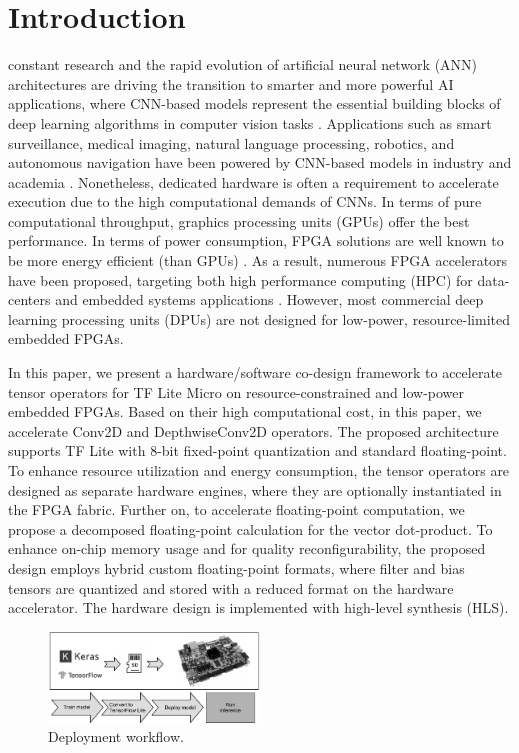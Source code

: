 
\section{Introduction}
\label{sec:introduction}
 constant research and the rapid evolution of artificial neural network (ANN) architectures are driving the transition to smarter and more powerful AI applications, where CNN-based models represent the essential building blocks of deep learning algorithms in computer vision tasks \cite{hassaballah2020deep}. Applications such as smart surveillance, medical imaging, natural language processing, robotics, and autonomous navigation have been powered by CNN-based models in industry and academia \cite{dhillon2020convolutional}. Nonetheless, dedicated hardware is often a requirement to accelerate execution due to the high computational demands of CNNs. In terms of pure computational throughput, graphics processing units (GPUs) offer the best performance. In terms of power consumption, FPGA solutions are well known to be more energy efficient (than GPUs) \cite{nurvitadhi2017can}. As a result, numerous FPGA accelerators have been proposed, targeting both high performance computing (HPC) for data-centers and embedded systems applications \cite{abdelouahab2018accelerating}. However, most commercial deep learning processing units (DPUs) are not designed for low-power, resource-limited embedded FPGAs.

In this paper, we present a hardware/software co-design framework to accelerate tensor operators for TF Lite Micro on resource-constrained and low-power embedded FPGAs. Based on their high computational cost, in this paper, we accelerate Conv2D and DepthwiseConv2D operators. The proposed architecture supports TF Lite with 8-bit fixed-point quantization and standard floating-point. To enhance resource utilization and energy consumption, the tensor operators are designed as separate hardware engines, where they are optionally instantiated in the FPGA fabric. Further on, to accelerate floating-point computation, we propose a decomposed floating-point calculation for the vector dot-product. To enhance on-chip memory usage and for quality reconfigurability, the proposed design employs hybrid custom floating-point formats, where filter and bias tensors are quantized and stored with a reduced format on the hardware accelerator. The hardware design is implemented with high-level synthesis (HLS).

\begin{figure}[t!]
	\centering
	\includegraphics[width=0.5\textwidth]{../figures/workflow.pdf}
	\caption{Deployment workflow.}
	\label{fig:workflow}
\end{figure}

